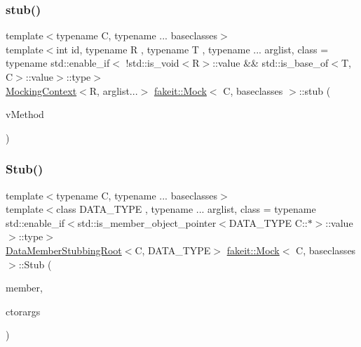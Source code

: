 \mbox{\label{classfakeit_1_1Mock_a7a8f38b58b068b35f263eee42d75c162}} 
\subsubsection{\texorpdfstring{stub()}{stub()}\hspace{0.1cm}{\footnotesize\ttfamily [9/72]}}
{\footnotesize\ttfamily template$<$typename C, typename ... baseclasses$>$ \\
template$<$int id, typename R , typename T , typename ... arglist, class  = typename std\+::enable\+\_\+if$<$                !std\+::is\+\_\+void$<$\+R$>$\+::value \&\& std\+::is\+\_\+base\+\_\+of$<$\+T, C$>$\+::value$>$\+::type$>$ \\
\mbox{\hyperlink{classfakeit_1_1MockingContext}{Mocking\+Context}}$<$R, arglist...$>$ \mbox{\hyperlink{classfakeit_1_1Mock}{fakeit\+::\+Mock}}$<$ C, baseclasses $>$\+::stub (\begin{DoxyParamCaption}\item[{R(T\+::$\ast$)(arglist...) const}]{v\+Method }\end{DoxyParamCaption})\hspace{0.3cm}{\ttfamily [inline]}}

\mbox{\label{classfakeit_1_1Mock_ae210824251ca071933f8a651bbe56047}} 
\subsubsection{\texorpdfstring{Stub()}{Stub()}\hspace{0.1cm}{\footnotesize\ttfamily [3/9]}}
{\footnotesize\ttfamily template$<$typename C, typename ... baseclasses$>$ \\
template$<$class D\+A\+T\+A\+\_\+\+T\+Y\+PE , typename ... arglist, class  = typename std\+::enable\+\_\+if$<$std\+::is\+\_\+member\+\_\+object\+\_\+pointer$<$\+D\+A\+T\+A\+\_\+\+T\+Y\+P\+E C\+::$\ast$$>$\+::value$>$\+::type$>$ \\
\mbox{\hyperlink{classfakeit_1_1DataMemberStubbingRoot}{Data\+Member\+Stubbing\+Root}}$<$C, D\+A\+T\+A\+\_\+\+T\+Y\+PE$>$ \mbox{\hyperlink{classfakeit_1_1Mock}{fakeit\+::\+Mock}}$<$ C, baseclasses $>$\+::Stub (\begin{DoxyParamCaption}\item[{D\+A\+T\+A\+\_\+\+T\+Y\+PE C\+::$\ast$}]{member,  }\item[{const arglist \&...}]{ctorargs }\end{DoxyParamCaption})\hspace{0.3cm}{\ttfamily [inline]}}

